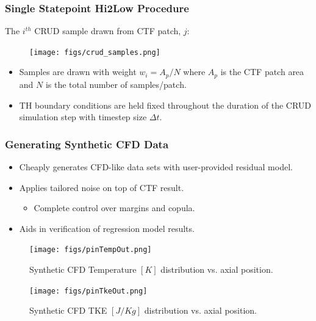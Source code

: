 \documentclass[t, pdftex]{beamer}
\begin{document}
\begin{frame}
\frametitle{Single Statepoint Hi2Low Procedure}
The $i^{th}$ CRUD sample drawn from CTF patch, $j$:
\begin{figure}[!htbp]
\centering
\texttt{[image: figs/crud\_samples.png]}
\label{model_overview}
\end{figure}
\begin{itemize}
\item Samples are drawn with weight $w_i=A_p/N$ where $A_p$ is the CTF patch area and $N$ is the total number of samples/patch.
\item TH boundary conditions are held fixed throughout the duration of the CRUD simulation step with timestep size $\Delta t$.
\end{itemize}
\end{frame}

\begin{frame}[shrink=20]
\frametitle{Generating Synthetic CFD Data}
\begin{itemize}
\item Cheaply generates CFD-like data sets with user-provided residual model.
\item Applies tailored noise on top of CTF result.
\begin{itemize}
	\item Complete control over margins and copula. 
\end{itemize}
\item Aids in verification of regression model results. 
\end{itemize}
\begin{figure}
        \centering
        \begin{minipage}{.5\textwidth}
            \centering
            \texttt{[image: figs/pinTempOut.png]}
            \caption{Synthetic CFD Temperature $[K]$ distribution vs. axial position.}
        \end{minipage}%
        \begin{minipage}{.5\textwidth}
            \centering
            \texttt{[image: figs/pinTkeOut.png]}
            \caption{Synthetic CFD TKE  $[J/Kg]$ distribution vs. axial position.}
        \end{minipage}
    \end{figure}
\end{frame}

\end{document}
